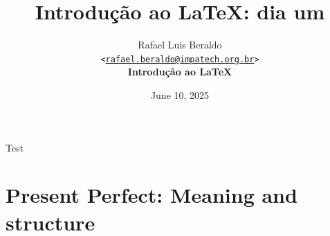 \documentclass[numbering=fraction,aspectratio=169]{beamer}
\title{Introdução ao \LaTeX: dia um}
\author[Rafael Beraldo]{Rafael Luis Beraldo\\
  \texttt{<\href{mailto:rafael.beraldo@impatech.org.br}{rafael.beraldo@impatech.org.br}>}\\
  \textbf{Introdução ao \LaTeX}}
\institute{\IMPATech}
\date{June 10, 2025}
\begin{document}
\frenchspacing

\begin{frame}[plain]{}
  \maketitle
\end{frame}

\begin{frame}{Test}

\end{frame}


\section{Present Perfect: Meaning and structure}



\end{document}
